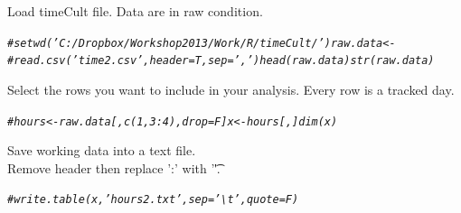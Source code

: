 \documentclass{report}\usepackage[]{graphicx}\usepackage[]{color}
\makeatletter
\newcommand{\hlcom}[1]{\textcolor[rgb]{0.678,0.584,0.686}{\textit{#1}}}%
\newenvironment{kframe}{%
 \def\at@end@of@kframe{}%
 \ifinner\ifhmode%
  \def\at@end@of@kframe{\end{minipage}}%
  \begin{minipage}{\columnwidth}%
 \fi\fi%
 \def\FrameCommand##1{\hskip\@totalleftmargin \hskip-\fboxsep
 \colorbox{shadecolor}{##1}\hskip-\fboxsep
     \hskip-\linewidth \hskip-\@totalleftmargin \hskip\columnwidth}%
 \MakeFramed {\advance\hsize-\width
   \@totalleftmargin\z@ \linewidth\hsize
   \@setminipage}}%
 {\par\unskip\endMakeFramed%
 \at@end@of@kframe}
\newenvironment{knitrout}{}{} %
\makeatother
\begin{document}
Load timeCult file. Data are in raw condition.
\begin{knitrout}
\color{fgcolor}\begin{kframe}
\begin{alltt}
\hlcom{# setwd('C:/Dropbox/Workshop2013/Work/R/timeCult/') raw.data <-}
\hlcom{# read.csv('time2.csv',header=T,sep=',') head(raw.data) str(raw.data)}
\end{alltt}
\end{kframe}
\end{knitrout}


Select the rows you want to include in your analysis. Every row is a
tracked day.
\begin{knitrout}
\color{fgcolor}\begin{kframe}
\begin{alltt}
\hlcom{# hours <- raw.data[,c(1,3:4),drop=F] x <- hours[,] dim(x)}
\end{alltt}
\end{kframe}
\end{knitrout}


Save working data into a text file.\\
Remove header then replace ':' with '\t'.
\begin{knitrout}
\color{fgcolor}\begin{kframe}
\begin{alltt}
\hlcom{# write.table(x,'hours2.txt',sep='\textbackslash{}t',quote=F)}
\end{alltt}
\end{kframe}
\end{knitrout}
\end{document}
